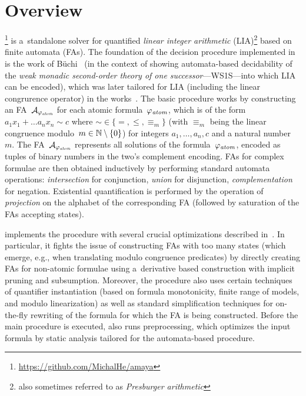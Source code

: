 \documentclass[acmsmall,screen,nonacm=true]{acmart}
\begin{document}
\vspace{-0.0mm}
\section{Overview}
\vspace{-0.0mm}

\amaya\footnote{\url{https://github.com/MichalHe/amaya}} is a~standalone solver for
quantified \emph{linear integer arithmetic}
(LIA)\footnote{also sometimes referred to as \emph{Presburger arithmetic}}
based on finite automata (FAs).
The foundation of the decision procedure implemented in \amaya 
is the work of B\"{u}chi~\cite{Buchi60} (in the context of showing
automata-based decidability of the \emph{weak monadic second-order theory of
one successor}---WS1S---into which LIA can be encoded), which was later
tailored for LIA (including the linear congrurence operator) in the
works~\cite{BoudetC96,BoigelotJW05,Durand-GasselinH10}.
The basic procedure works by constructing an FA~$\mathcal{A}_{\varphi_{\mathit{atom}}}$ for
each atomic formula~$\varphi_{\mathit{atom}}$, which
is of the form $a_1 x_1 + \ldots a_n x_n \sim c$ where ${\sim} \in \{{=},
{\leq}, {\equiv_m}\}$ (with $\equiv_m$ being the linear congruence modulo~$m \in \mathbb{N} \setminus \{0\}$)
for integers $a_1, \ldots, a_n, c$ and a natural number~$m$.
The FA~$\mathcal{A}_{\varphi_{\mathit{atom}}}$ represents all solutions of the formula~$\varphi_{\mathit{atom}}$,
encoded as tuples of binary numbers in the two's complement encoding.
FAs for complex formulae are then obtained inductively by performing standard
automata operations: \emph{intersection} for conjunction, \emph{union} for disjunction,
\emph{complementation} for negation.
Existential quantification is performed by the operation of \emph{projection}
on the alphabet of the corresponding FA (followed by saturation of the FAs
accepting states).

\amaya implements the procedure with several crucial optimizations described
in~\cite{HabermehlHHHL24}.
In particular, it fights the issue of constructing FAs with too many states
(which emerge, e.g., when translating modulo congruence predicates) by directly
creating FAs for non-atomic formulae using a~derivative based construction with
implicit pruning and subsumption.
Moreover, the procedure also uses certain techniques of quantifier
instantiation (based on formula monotonicity, finite range of models, and
modulo linearization) as well as standard simplification techniques for
on-the-fly rewriting of the formula for which the FA is being constructed. 
Before the main procedure is executed, \amaya also runs preprocessing, which
optimizes the input formula by static analysis tailored for the automata-based
procedure.
\end{document}
